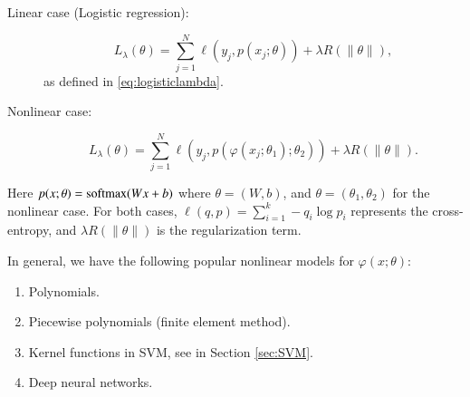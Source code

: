 \begin{description}
\item[Linear case (Logistic regression):] 
$$
L_{\lambda }(\theta) = \sum_{j=1}^N \ell (y_j, p(x_j; \theta)) + \lambda R(\|\theta\|),
$$
as defined in \eqref{eq:logisticlambda}.
\item[Nonlinear case: ]
$$
L_{\lambda }(\theta) = \sum_{j=1}^N \ell (y_j, p( \varphi(x_j; \theta_1); \theta_2)) + \lambda R(\|\theta\|).
$$
\end{description}
Here $p(x; \theta) = {\rm softmax}(Wx + b)$ where $\theta = (W,b)$,
and $\theta = (\theta_1, \theta_2)$ for the nonlinear case.
For both cases, $\displaystyle \ell(q, p) = \sum_{i=1}^k - q_i \log p_i$  represents the cross-entropy, and $\lambda R(\|\theta\|)$ is the  regularization term.

In general, we have the following popular nonlinear models for $\varphi(x;\theta)$:
\begin{enumerate}
	\item Polynomials.
	\item Piecewise polynomials (finite element method).
	\item Kernel functions in SVM, see in Section \ref{sec:SVM}.
	\item Deep neural networks.
\end{enumerate}
 
 
 
 

\endinput

Based on the theorem of partition of unit, we may also have the next definition for 
nonlinear classifiable.
\begin{definition}[nonlinearly separable via partition of unit]
	These data sets $A_1, A_2, \cdots, A_k \subset \mathbb{R}^d$ are called nonlinearly separable, 
	if there exist smooth
	\begin{equation}\label{key}
	\varphi_i: \mathbb{R}^d \mapsto [0, 1], \quad i = 1, 2, \cdots, k,
	\end{equation}
	such that
	\begin{equation}\label{key}
	\varphi_i(x) = 1, x \in A_i  \text{ and } \varphi_i(0) = 1, x \in A_j,    \text{ for } i, j= 1, 2, \cdots, k \text{ but } j \neq i,
	\end{equation}
	and 
	\begin{equation}\label{key}
	\sum_{i=1}^k \varphi_i(x) = 1, \quad \forall x \in \mathbb{R}^d.
	\end{equation}
	are linearly separable.
\end{definition}

